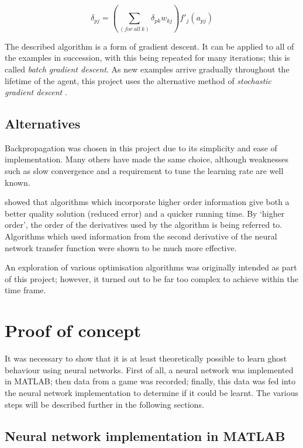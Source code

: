 \begin{equation}
\delta_{pj} = \left(\sum_{(for~all~k)}\delta_{pk}w_{kj}\right)f'_{j}(a_{pj})
\label{eq:hiddenerror}
\end{equation}

The described algorithm is a form of gradient descent.  It can be applied to all of the examples in succession, with this being repeated for many iterations; this is called \emph{batch gradient descent}.  As new examples arrive gradually throughout the lifetime of the agent, this project uses the alternative method of \emph{stochastic gradient descent} \citep[p. 720]{RussellNorvig}.

\subsection{Alternatives}

Backpropagation was chosen in this project due to its simplicity and ease of implementation.  Many others have made the same choice, although weaknesses such as slow convergence and a requirement to tune the learning rate are well known.

\citet{Groot1994} showed that algorithms which incorporate higher order information give both a better quality solution (reduced error) and a quicker running time.  By `higher order', the order of the derivatives used by the algorithm is being referred to.  Algorithms which used information from the second derivative of the neural network transfer function were shown to be much more effective.

An exploration of various optimisation algorithms was originally intended as part of this project; however, it turned out to be far too complex to achieve within the time frame.

\section{Proof of concept}

It was necessary to show that it is at least theoretically possible to learn ghost behaviour using neural networks.  First of all, a neural network was implemented in MATLAB; then data from a game was recorded; finally, this data was fed into the neural network implementation to determine if it could be learnt.  The various steps will be described further in the following sections.

\subsection{Neural network implementation in MATLAB}

